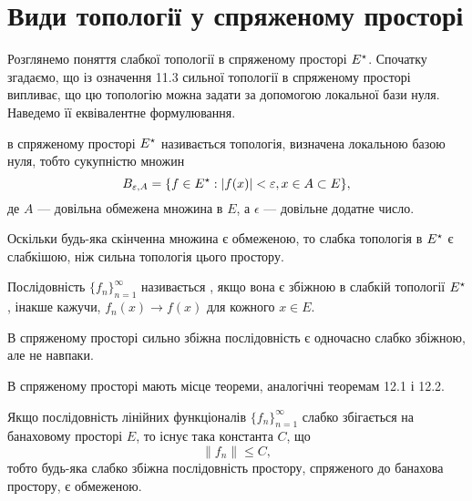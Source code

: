 \section{Види топології у спряженому просторі}

Розглянемо поняття слабкої топології в спряженому
просторі $E^\star$. Спочатку згадаємо, що із означення 11.3 сильної
топології в спряженому просторі випливає, що цю топологію
можна задати за допомогою локальної бази нуля. Наведемо її
еквівалентне формулювання.

\begin{definition}
 в спряженому просторі
$E^\star$ називається топологія, визначена локальною базою нуля,
тобто сукупністю множин
\begin{equation*}
    B_{\varepsilon, A} = \{ f \in E^\star: |f(x)| < \varepsilon, x \in A \subset E\},
\end{equation*}
де $A$ --- довільна обмежена множина в $E$, а $\epsilon$ --- довільне
додатне число.
\end{definition}

\begin{remark}
Оскільки будь-яка скінченна множина є
обмеженою, то слабка топологія в $E^\star$ є слабкішою, ніж
сильна топологія цього простору.
\end{remark}

\begin{definition}
Послідовність $\{f_n\}_{n = 1}^\infty$
називається ,
якщо вона є збіжною в слабкій топології $E^\star$,
інакше кажучи, $f_n(x) \to f(x)$ для кожного $x \in E$.
\end{definition}

\begin{remark}
В спряженому просторі сильно збіжна
послідовність є одночасно слабко збіжною, але не навпаки.
\end{remark}

В спряженому просторі мають місце теореми, аналогічні
теоремам 12.1 і 12.2.

\begin{theorem}
Якщо послідовність лінійних функціоналів
$\{f_n\}_{n = 1}^\infty$
слабко збігається на банаховому просторі $E$, то
існує така константа $C$, що
\begin{equation*}
    \|f_n\| \le C,
\end{equation*}
тобто будь-яка слабко збіжна послідовність простору,
спряженого до банахова простору, є обмеженою.
\end{theorem}

